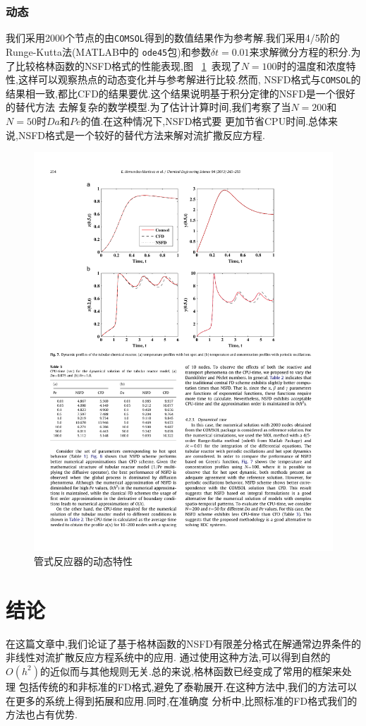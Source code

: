 \documentclass[a4paper,cs4size,adobefonts,cm-default,no-math]{ctexart}
\begin{document}
\subsubsection{动态}
我们采用2000个节点的由\texttt{COMSOL}得到的数值结果作为参考解.我们采用4/5阶的Runge-Kutta法(MATLAB中的
\texttt{ode45}包)和参数$\delta t = 0.01$来求解微分方程的积分.为了比较格林函数的NSFD格式的性能表现,图
~\ref{fig:7}~表现了$N=100$时的温度和浓度特性,这样可以观察热点的动态变化并与参考解进行比较.然而,
NSFD格式与\texttt{COMSOL}的结果相一致,都比CFD的结果要优.这个结果说明基于积分定律的NSFD是一个很好的替代方法
去解复杂的数学模型.为了估计计算时间,我们考察了当$N=200$和$N=50$时$Da$和$Pe$的值.在这种情况下,NSFD格式要
更加节省CPU时间.总体来说,NSFD格式是一个较好的替代方法来解对流扩撒反应方程.
\begin{figure}[t]
\centering
\includegraphics[trim=80 400 80 60,clip]{./pic/f7.pdf}
\caption{管式反应器的动态特性}\label{fig:7}
\end{figure}
\section{结论}
在这篇文章中,我们论证了基于格林函数的NSFD有限差分格式在解通常边界条件的非线性对流扩散反应方程系统中的应用.
通过使用这种方法,可以得到自然的$O(h^2)$的近似而与其他规则无关.总的来说,格林函数已经变成了常用的框架来处理
包括传统的和非标准的FD格式,避免了泰勒展开.在这种方法中,我们的方法可以在更多的系统上得到拓展和应用.同时,在准确度
分析中,比照标准的FD格式我们的方法也占有优势.
\end{document}
